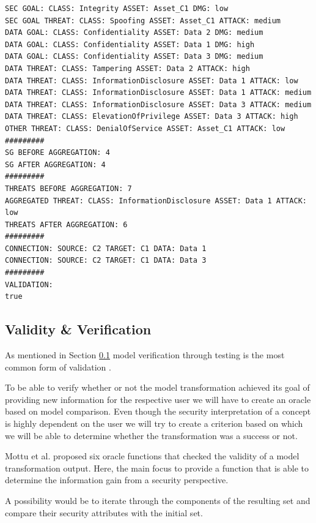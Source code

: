 \begin{minipage}{\linewidth}
\begin{lstlisting}[floatplacement=H,caption=Output for Component C1,label=code1,basicstyle=\scriptsize]
SEC GOAL: CLASS: Integrity ASSET: Asset_C1 DMG: low
SEC GOAL THREAT: CLASS: Spoofing ASSET: Asset_C1 ATTACK: medium
DATA GOAL: CLASS: Confidentiality ASSET: Data 2 DMG: medium
DATA GOAL: CLASS: Confidentiality ASSET: Data 1 DMG: high
DATA GOAL: CLASS: Confidentiality ASSET: Data 3 DMG: medium
DATA THREAT: CLASS: Tampering ASSET: Data 2 ATTACK: high
DATA THREAT: CLASS: InformationDisclosure ASSET: Data 1 ATTACK: low
DATA THREAT: CLASS: InformationDisclosure ASSET: Data 1 ATTACK: medium
DATA THREAT: CLASS: InformationDisclosure ASSET: Data 3 ATTACK: medium
DATA THREAT: CLASS: ElevationOfPrivilege ASSET: Data 3 ATTACK: high
OTHER THREAT: CLASS: DenialOfService ASSET: Asset_C1 ATTACK: low
#########
SG BEFORE AGGREGATION: 4
SG AFTER AGGREGATION: 4
#########
THREATS BEFORE AGGREGATION: 7
AGGREGATED THREAT: CLASS: InformationDisclosure ASSET: Data 1 ATTACK: low
THREATS AFTER AGGREGATION: 6
#########
CONNECTION: SOURCE: C2 TARGET: C1 DATA: Data 1
CONNECTION: SOURCE: C2 TARGET: C1 DATA: Data 3
#########
VALIDATION: 
true
\end{lstlisting}
\end{minipage}
\subsection{Validity \& Verification}
\label{subsec:validation}

As mentioned in Section \ref{subsec:validation} model verification through testing is the most common form of validation \cite{fleurey}.

To be able to verify whether or not the model transformation achieved its goal of providing new information for the respective user we will have to create an oracle based on model comparison. Even though the security interpretation of a concept is highly dependent on the user we will try to create a criterion based on which we will be able to determine whether the transformation was a success or not.

Mottu et al. \cite{mottu} proposed six oracle functions that checked the validity of a model transformation output. Here, the main focus to provide a function that is able to determine the information gain from a security perspective.

A possibility would be to iterate through the components of the resulting set and compare their security attributes with the initial set.

